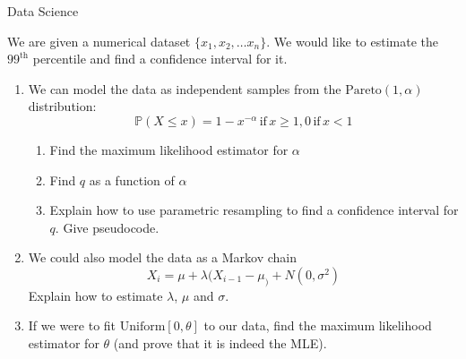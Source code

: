 \documentclass{tripos}  %
\begin{document}
\begin{question}[MockIB,year=2024,paper=2,question=2,author=rrw]{Data Science}


  We are given a numerical dataset $\{ x_1, x_2, \dots{} x_n\}$. We would like to estimate the ${99}^{\mbox{th}}$ percentile and find a confidence interval for it.
  
  \begin{enumerate}
  \item We can model the data as independent samples from the $\mbox{Pareto}(1,\alpha)$ distribution:
    \[
    \mathbb{P}(X \leq x) = 1-x^{-\alpha}\, \mbox{if}\, x \ge 1 , 0\,\mbox{if}\, x < 1
    \]
    \begin{enumerate}
    \item Find the maximum likelihood estimator for $\alpha$ 
    \item Find $q$ as a function of $\alpha$ 
    \item Explain how to use parametric resampling to find a confidence interval for $q$. Give pseudocode. 
    \end{enumerate}
  \item We could also model the data as a Markov chain
    \[
    X_i = \mu{} + \lambda{}(X_{i-1}-\mu_) + N(0,\sigma^2)
    \]
    Explain how to estimate $\lambda{}$, $\mu{}$ and $\sigma{}$.
\item If we were to fit $\mbox{Uniform}[0,\theta]$ to our data, find the maximum likelihood estimator for $\theta$ (and prove that it is indeed the MLE). 
    \end{enumerate}

\end{question}
\end{document}
